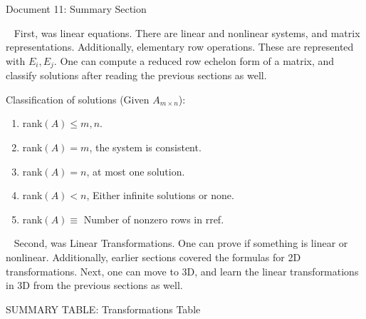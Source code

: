 \documentclass[11pt]{article}
\begin{document}
\begin{center}
Document 11: Summary Section
\end{center}

\setlength{\leftskip}{0 in}
$\,\,\,$ First, was linear equations. There are linear and nonlinear systems, and matrix representations. Additionally, elementary row operations. These are represented with $E_i,E_j$. One can compute a reduced row echelon form of a matrix, and classify solutions after reading the previous sections as well.

Classification of solutions (Given $A_{m\times n}$):
\begin{enumerate}
\item rank$(A)\leq m,n$.
\item rank$(A)=m$, the system is consistent.
\item rank$(A)=n$, at most one solution.
\item rank$(A)<n$, Either infinite solutions or none.
\item rank$(A)\equiv$ Number of nonzero rows in rref.
\end{enumerate}

$\,\,\,$ Second, was Linear Transformations. One can prove if something is linear or nonlinear. Additionally, earlier sections covered the formulas for 2D transformations. Next, one can move to 3D, and learn the linear transformations in 3D from the previous sections as well.

\begin{center}
SUMMARY TABLE: Transformations Table
\end{center}
\end{document}
